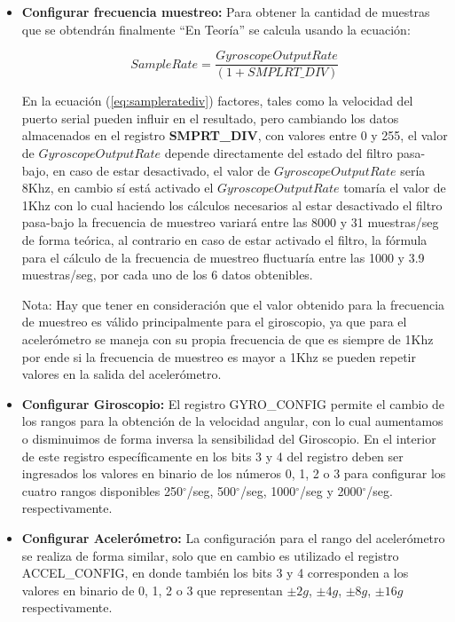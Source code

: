 \documentclass[12pt,a4paper]{article}
\newcommand{\grad}{$^{\circ}$}
\begin{document}
\begin{itemize}
	\item \textbf{Configurar frecuencia muestreo:} Para obtener la cantidad de muestras que se obtendrán finalmente ``En Teoría'' se calcula usando la ecuación: 
	
	\begin{equation} 
		\label{eq:sampleratediv}
		Sample Rate = \frac{Gyroscope Output Rate}{(1 + SMPLRT\_DIV) }
	\end{equation}
	
	En la ecuación (\ref{eq:sampleratediv}) factores, tales como la velocidad del puerto serial pueden influir en el resultado, pero cambiando los datos almacenados en el registro \textbf{SMPRT\_DIV}, con valores entre 0 y 255, el valor de $Gyroscope Output Rate$ depende directamente del estado del filtro pasa-bajo, en caso de estar desactivado, el valor de $Gyroscope Output Rate$ sería 8Khz, en cambio sí está activado el $Gyroscope Output Rate$ tomaría el valor de 1Khz con lo cual haciendo los cálculos necesarios al estar desactivado el filtro pasa-bajo la frecuencia de muestreo variará entre las 8000 y 31 muestras/seg de forma teórica, al contrario en caso de estar activado el filtro, la fórmula para el cálculo de la frecuencia de muestreo fluctuaría entre las 1000 y 3.9 muestras/seg, por cada uno de los 6 datos obtenibles.
	
	Nota: Hay que tener en consideración que el valor obtenido para la frecuencia de muestreo es válido principalmente para el giroscopio, ya que para el acelerómetro se maneja con su propia frecuencia de que es siempre de 1Khz por ende si la frecuencia de muestreo es mayor a 1Khz se pueden repetir valores en la salida del acelerómetro.
	
	\item \textbf{Configurar Giroscopio:} El registro GYRO\_CONFIG permite el cambio de los rangos para la obtención de la velocidad angular, con lo cual aumentamos o disminuimos de forma inversa la sensibilidad del Giroscopio. En el interior de este registro específicamente en los bits 3 y 4 del registro deben ser ingresados los valores en binario de los números 0, 1, 2 o 3 para configurar los cuatro rangos disponibles 250\grad/seg, 500\grad/seg, 1000\grad/seg y 2000\grad/seg. respectivamente.
	
	\item \textbf{Configurar Acelerómetro:} La configuración para el rango del acelerómetro se realiza de forma similar, solo que en cambio es utilizado el registro ACCEL\_CONFIG, en donde también los bits 3 y 4 corresponden a los valores en binario de 0, 1, 2 o 3 que representan $\pm 2g$, $\pm 4g$, $\pm 8g$, $\pm 16g$ respectivamente.
	
\end{itemize}
\end{document}
